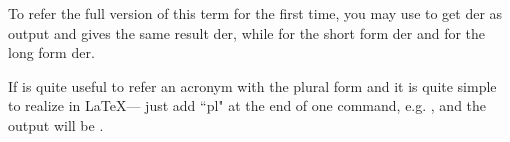 	{}
	
	To refer the full version of this term for the first time, you may use {} to get \colorbox{yellow!60}{\gls{der}} as output and {} gives the same result \colorbox{yellow!60}{\acrfull{der}}, while {} for the short form \colorbox{yellow!60}{\acrshort{der}} and {} for the long form \colorbox{yellow!60}{\acrlong{der}}.
	
	If is quite useful to refer an acronym with the plural form and it is quite simple to realize in \LaTeX --- just add ``pl" at the end of one command, e.g. {}, and the output will be \colorbox{yellow!60}{}.